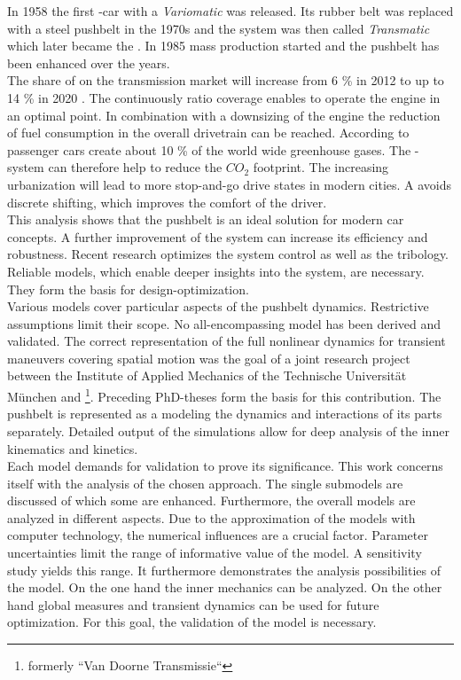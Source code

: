 In 1958 the first \DAF-car with a \emph{Variomatic} was released.
Its rubber belt was replaced with a steel pushbelt in the 1970s and the system was then called \emph{Transmatic} which later became the \CVT.
In 1985 mass production started and the pushbelt has been enhanced over the years.\\
The share of \CVTs on the transmission market will increase from 6 \% in 2012 to up to 14 \% in 2020 \cite{idler_fresstragfahigkeit_2014}.
The continuously ratio coverage enables to operate the engine in an optimal point.
In combination with a downsizing of the engine the reduction of fuel consumption in the overall drivetrain can be reached.
According to \cite{srivastava_modeling_2006} passenger cars create about 10 \% of the world wide greenhouse gases.
The \CVT-system can therefore help to reduce the $CO_2$ footprint.
The increasing urbanization \cite{martine_state_2007} will lead to more stop-and-go drive states in modern cities.
A \CVT avoids discrete shifting, which improves the comfort of the driver.\\
This analysis shows that the pushbelt \CVT is an ideal solution for modern car concepts.
A further improvement of the system can increase its efficiency and robustness.
Recent research optimizes the system control as well as the tribology.
Reliable models, which enable deeper insights into the system, are necessary. 
They form the basis for design-optimization.\\
Various models cover particular aspects of the pushbelt \CVT dynamics.
Restrictive assumptions limit their scope.
No all-encompassing model has been derived and validated.
The correct representation of the full nonlinear dynamics for transient maneuvers covering spatial motion was the goal of a joint research project between the Institute of Applied Mechanics of the Technische Universität München and \Bosch\footnote{formerly ``Van Doorne Transmissie``}.
Preceding PhD-theses \cite{bullinger_dynamik_2005, geier_dynamics_2007, schindler_spatial_2010, cebulla_spatial_2014} form the basis for this contribution.
The pushbelt \CVT is represented as a \MBS modeling the dynamics and interactions of its parts separately.
Detailed output of the simulations allow for deep analysis of the inner kinematics and kinetics.\\
Each model demands for validation to prove its significance.
This work concerns itself with the analysis of the chosen approach.
The single submodels are discussed of which some are enhanced.
Furthermore, the overall models are analyzed in different aspects.
Due to the approximation of the models with computer technology, the numerical influences are a crucial factor.
Parameter uncertainties limit the range of informative value of the model.
A sensitivity study yields this range.
It furthermore demonstrates the analysis possibilities of the model.
On the one hand the inner mechanics can be analyzed.
On the other hand global measures and transient dynamics can be used for future optimization.
For this goal, the validation of the model is necessary.\par

